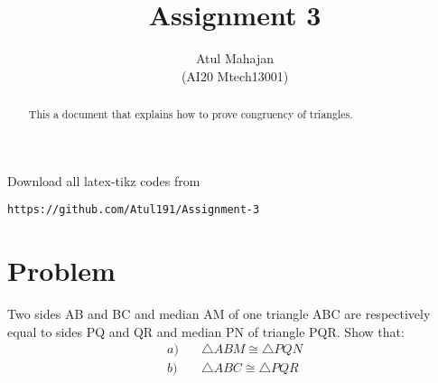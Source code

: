 \documentclass[journal,12pt,twocolumn]{IEEEtran}
\begin{document}
\makeatletter
{}
\makeatother
\let\StandardTheFigure\thefigure
\let\vec\mathbf
\renewcommand{\thefigure}{\theproblem}
\def\putbox#1#2#3{\makebox[0in][l]{\makebox[#1][l]{}\raisebox{\baselineskip}[0in][0in]{\raisebox{#2}[0in][0in]{#3}}}}
     \def\rightbox#1{\makebox[0in][r]{#1}}
     \def\centbox#1{\makebox[0in]{#1}}
     \def\topbox#1{\raisebox{-\baselineskip}[0in][0in]{#1}}
     \def\midbox#1{\raisebox{-0.5\baselineskip}[0in][0in]{#1}}
\vspace{3cm}
\title{Assignment 3}
\author{Atul Mahajan\\ (AI20 Mtech13001)}
\maketitle
\newpage
\bigskip
\renewcommand{\thefigure}{\theenumi}
\renewcommand{\thetable}{\theenumi}
\begin{abstract}
This a document that explains how to prove congruency of triangles.
\end{abstract}
Download all latex-tikz codes from 
%
\begin{lstlisting}
https://github.com/Atul191/Assignment-3
\end{lstlisting}
%
\section{Problem}
Two sides AB and BC and median AM of one triangle ABC are respectively equal to sides PQ and QR and median PN of triangle PQR. Show that:
\begin{align}
a) & \quad	\triangle ABM \cong \triangle PQN \\
b) & \quad \triangle ABC \cong \triangle PQR
\end{align}
\end{document}
